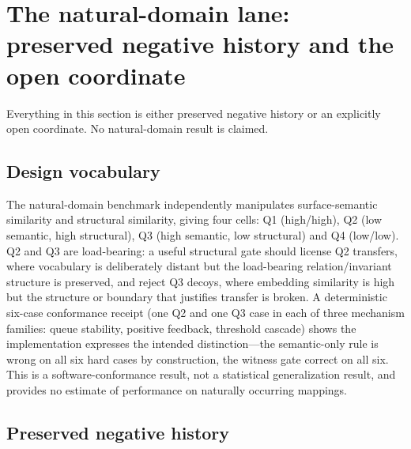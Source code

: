 \section{The natural-domain lane: preserved negative history and the open coordinate}
\label{sec:natural-domain}

Everything in this section is either preserved negative history or an explicitly open coordinate. No natural-domain result is claimed.

\subsection{Design vocabulary}

The natural-domain benchmark independently manipulates surface-semantic similarity and structural similarity, giving four cells: Q1 (high/high), Q2 (low semantic, high structural), Q3 (high semantic, low structural) and Q4 (low/low). Q2 and Q3 are load-bearing: a useful structural gate should license Q2 transfers, where vocabulary is deliberately distant but the load-bearing relation/invariant structure is preserved, and reject Q3 decoys, where embedding similarity is high but the structure or boundary that justifies transfer is broken. A deterministic six-case conformance receipt (one Q2 and one Q3 case in each of three mechanism families: queue stability, positive feedback, threshold cascade) shows the implementation expresses the intended distinction---the semantic-only rule is wrong on all six hard cases by construction, the witness gate correct on all six. This is a software-conformance result, not a statistical generalization result, and provides no estimate of performance on naturally occurring mappings.

\subsection{Preserved negative history}

